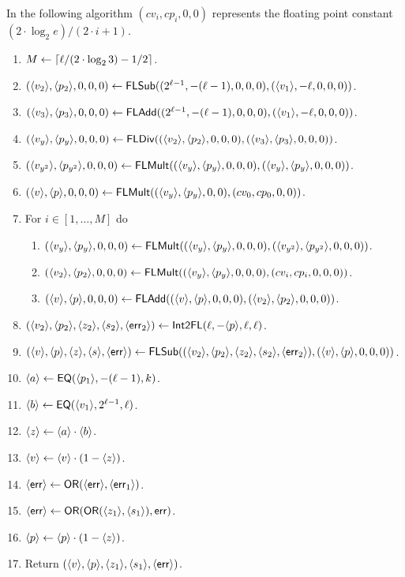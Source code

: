   In the following algorithm $(cv_i,cp_i,0,0)$ represents the floating point
  constant $(2 \cdot \log_2 e)/(2 \cdot i+1)$.
  \begin{enumerate}
    \item $M \leftarrow {\lceil  \ell/(2 \cdot \log_2 3)-1/2 \rceil}$.
    \item $(\langle v_2 \rangle,\langle p_2 \rangle,0,0,0) \leftarrow \mathsf{FLSub}((2^{\ell-1},-(\ell-1),0,0,0),(\langle v_1 \rangle,-\ell,0,0,0))$.
    \item $(\langle v_3 \rangle,\langle p_3 \rangle,0,0,0) \leftarrow \mathsf{FLAdd}((2^{\ell-1},-(\ell-1),0,0,0),(\langle v_1 \rangle,-\ell,0,0,0))$.
    \item $(\langle v_y \rangle,\langle p_y \rangle,0,0,0) \leftarrow \mathsf{FLDiv}((\langle v_2 \rangle,\langle p_2 \rangle,0,0,0),(\langle v_3 \rangle,\langle p_3 \rangle,0,0,0))$.
    \item $(\langle v_{y^2} \rangle,\langle p_{y^2} \rangle,0,0,0) \leftarrow \mathsf{FLMult}((\langle v_y \rangle,\langle p_y \rangle,0,0,0),(\langle v_y \rangle,\langle p_y \rangle,0,0,0))$.
    \item $(\langle v \rangle,\langle p \rangle,0,0,0) \leftarrow  \mathsf{FLMult}((\langle v_y \rangle,\langle p_y \rangle,0,0),(cv_0,cp_0,0,0))$.
    \item For $i \in[1,\ldots,M]$ do
          \begin{enumerate}
            \item $(\langle v_y \rangle,\langle p_y \rangle,0,0,0) \leftarrow \mathsf{FLMult}((\langle v_y \rangle,\langle p_y \rangle,0,0,0),(\langle v_{y^2} \rangle,\langle p_{y^2} \rangle,0,0,0))$.
            \item $(\langle v_2 \rangle,\langle p_2 \rangle,0,0,0) \leftarrow \mathsf{FLMult}((\langle v_y \rangle,\langle p_y \rangle,0,0,0),(cv_i,cp_i,0,0,0))$.
            \item $(\langle v \rangle,\langle p \rangle,0,0,0) \leftarrow \mathsf{FLAdd}((\langle v \rangle,\langle p \rangle,0,0,0),(\langle v_2 \rangle,\langle p_2 \rangle,0,0,0))$.
          \end{enumerate}
    \item $(\langle v_2 \rangle,\langle p_2 \rangle,\langle z_2 \rangle,\langle s_2 \rangle,\langle \mathsf{err}_2 \rangle) \leftarrow \mathsf{Int2FL}(\ell,-\langle p \rangle,\ell,\ell)$.
    \item $(\langle v \rangle,\langle p \rangle,\langle z \rangle,\langle s \rangle,\langle \mathsf{err} \rangle) \leftarrow \mathsf{FLSub}((\langle v_2 \rangle,\langle p_2 \rangle,\langle z_2 \rangle,\langle s_2 \rangle,\langle \mathsf{err}_2 \rangle),(\langle v \rangle,\langle p \rangle,0,0,0))$.
    \item $\langle a \rangle \leftarrow \mathsf{EQ}(\langle p_1 \rangle,-(\ell-1),k)$.
    \item $\langle b \rangle \leftarrow \mathsf{EQ}(\langle v_1 \rangle,2^{\ell-1},\ell)$.
    \item $\langle z \rangle \leftarrow \langle a \rangle \cdot \langle b \rangle$.
    \item $\langle v \rangle \leftarrow \langle v \rangle \cdot(1-\langle z \rangle)$.
    \item $\langle \mathsf{err} \rangle \leftarrow \mathsf{OR}(\langle \mathsf{err} \rangle,\langle \mathsf{err}_1 \rangle)$.
    \item $\langle \mathsf{err} \rangle \leftarrow \mathsf{OR}(\mathsf{OR}(\langle z_1 \rangle,\langle s_1 \rangle),\mathsf{err})$.
    \item $\langle p \rangle \leftarrow \langle p \rangle \cdot(1-\langle z \rangle)$.
    \item Return $(\langle v \rangle,\langle p \rangle,\langle z_1 \rangle,\langle s_1 \rangle,\langle \mathsf{err} \rangle)$.
  \end{enumerate}


